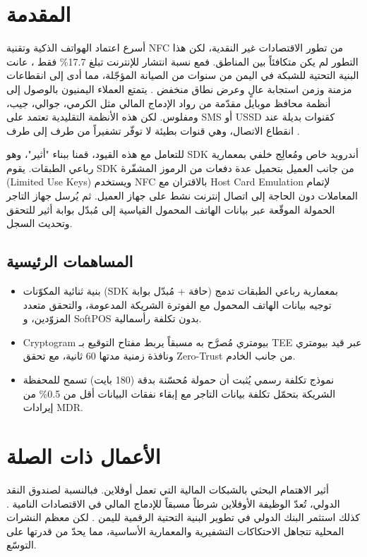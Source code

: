 \documentclass[12pt,a4paper]{article}
\begin{document}
\section{المقدمة}
أسرع اعتماد الهواتف الذكية وتقنية NFC من تطور الاقتصادات غير النقدية، لكن هذا التطور لم يكن متكافئاً بين المناطق. فمع نسبة انتشار للإنترنت تبلغ 17.7\% فقط \cite{datareportal2024}، عانت البنية التحتية للشبكة في اليمن من سنوات من الصيانة المؤجّلة، مما أدى إلى انقطاعات مزمنة وزمن استجابة عالٍ وعرض نطاق منخفض \cite{ookla2024}. يتمتع العملاء اليمنيون بالوصول إلى أنظمة محافظ موبايل مقدّمة من رواد الإدماج المالي مثل الكرمي، جوالي، جيب، ومفلوس. لكن هذه الأنظمة التقليدية تعتمد على SMS أو USSD كقنوات بديلة عند انقطاع الاتصال، وهي قنوات بطيئة لا توفّر تشفيراً من طرف إلى طرف \cite{gsma2023}.

للتعامل مع هذه القيود، قمنا ببناء "أثير"، وهو SDK أندرويد خاص ومُعالِج خلفي بمعمارية رباعي الطبقات. يقوم SDK من جانب العميل بتحميل عدة دفعات من الرموز المشفّرة (Limited Use Keys) ويستخدم NFC بالاقتران مع Host Card Emulation لإتمام المعاملات دون الحاجة إلى اتصال إنترنت نشط على جهاز العميل. ثم يُرسل جهاز التاجر الحمولة الموقّعة عبر بيانات الهاتف المحمول القياسية إلى مُبدّل بوابة أثير للتحقق وتحديث السجل.

\subsection*{المساهمات الرئيسية}
\begin{itemize}
\item بنية ثنائية المكوّنات (SDK حافة + مُبدّل بوابة) بمعمارية رباعي الطبقات تدمج توجيه بيانات الهاتف المحمول مع الفوترة الشريكة المدعومة، والتحقق متعدد المزوّدين، و SoftPOS بدون تكلفة رأسمالية.
\item Cryptogram بيومتري مُصرَّح به مسبقاً يربط مفتاح التوقيع بـ TEE عبر قيد بيومتري ونافذة زمنية مدتها 60 ثانية، مع تحقق Zero-Trust من جانب الخادم.
\item نموذج تكلفة رسمي يُثبت أن حمولة مُحسّنة بدقة (180 بايت) تسمح للمحفظة الشريكة بتحمّل تكلفة بيانات التاجر مع إبقاء نفقات البيانات أقل من 0.5\% من إيرادات MDR.
\end{itemize}

\section{الأعمال ذات الصلة}
أثير الاهتمام البحثي بالشبكات المالية التي تعمل أوفلاين. فبالنسبة لصندوق النقد الدولي، تُعدّ الوظيفة الأوفلاين شرطاً مسبقاً للإدماج المالي في الاقتصادات النامية \cite{imf2022}. كذلك استثمر البنك الدولي في تطوير البنية التحتية الرقمية لليمن \cite{worldbank2023}. لكن معظم النشرات المحلية تتجاهل الاحتكاكات التشفيرية والمعمارية الأساسية، مما يحدّ من قدرتها على التوسّع.
\end{document}
